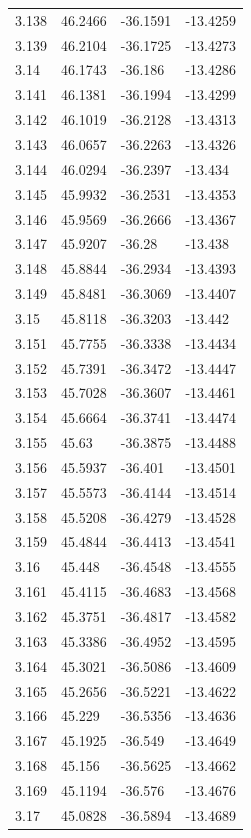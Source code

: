 \begin{tabular}{llll}
3.138 & 46.2466 & -36.1591 & -13.4259 \\
3.139 & 46.2104 & -36.1725 & -13.4273 \\
3.14 & 46.1743 & -36.186 & -13.4286 \\
3.141 & 46.1381 & -36.1994 & -13.4299 \\
3.142 & 46.1019 & -36.2128 & -13.4313 \\
3.143 & 46.0657 & -36.2263 & -13.4326 \\
3.144 & 46.0294 & -36.2397 & -13.434 \\
3.145 & 45.9932 & -36.2531 & -13.4353 \\
3.146 & 45.9569 & -36.2666 & -13.4367 \\
3.147 & 45.9207 & -36.28 & -13.438 \\
3.148 & 45.8844 & -36.2934 & -13.4393 \\
3.149 & 45.8481 & -36.3069 & -13.4407 \\
3.15 & 45.8118 & -36.3203 & -13.442 \\
3.151 & 45.7755 & -36.3338 & -13.4434 \\
3.152 & 45.7391 & -36.3472 & -13.4447 \\
3.153 & 45.7028 & -36.3607 & -13.4461 \\
3.154 & 45.6664 & -36.3741 & -13.4474 \\
3.155 & 45.63 & -36.3875 & -13.4488 \\
3.156 & 45.5937 & -36.401 & -13.4501 \\
3.157 & 45.5573 & -36.4144 & -13.4514 \\
3.158 & 45.5208 & -36.4279 & -13.4528 \\
3.159 & 45.4844 & -36.4413 & -13.4541 \\
3.16 & 45.448 & -36.4548 & -13.4555 \\
3.161 & 45.4115 & -36.4683 & -13.4568 \\
3.162 & 45.3751 & -36.4817 & -13.4582 \\
3.163 & 45.3386 & -36.4952 & -13.4595 \\
3.164 & 45.3021 & -36.5086 & -13.4609 \\
3.165 & 45.2656 & -36.5221 & -13.4622 \\
3.166 & 45.229 & -36.5356 & -13.4636 \\
3.167 & 45.1925 & -36.549 & -13.4649 \\
3.168 & 45.156 & -36.5625 & -13.4662 \\
3.169 & 45.1194 & -36.576 & -13.4676 \\
3.17 & 45.0828 & -36.5894 & -13.4689 \\

\end{tabular}
